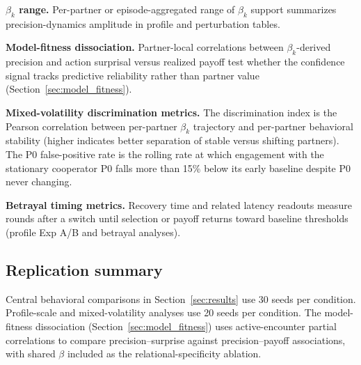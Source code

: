 \textbf{$\beta_k$ range.} Per-partner or episode-aggregated range of $\beta_k$ support summarizes precision-dynamics amplitude in profile and perturbation tables.

\textbf{Model-fitness dissociation.} Partner-local correlations between $\beta_k$-derived precision and action surprisal versus realized payoff test whether the confidence signal tracks predictive reliability rather than partner value (Section~\ref{sec:model_fitness}).

\textbf{Mixed-volatility discrimination metrics.} The discrimination index is the Pearson correlation between per-partner $\beta_k$ trajectory and per-partner behavioral stability (higher indicates better separation of stable versus shifting partners). The P0 false-positive rate is the rolling rate at which engagement with the stationary cooperator P0 falls more than 15\% below its early baseline despite P0 never changing.

\textbf{Betrayal timing metrics.} Recovery time and related latency readouts measure rounds after a switch until selection or payoff returns toward baseline thresholds (profile Exp A/B and betrayal analyses).

\subsection{Replication summary}

Central behavioral comparisons in Section~\ref{sec:results} use 30 seeds per condition. Profile-scale and mixed-volatility analyses use 20 seeds per condition. The model-fitness dissociation (Section~\ref{sec:model_fitness}) uses active-encounter partial correlations to compare precision--surprise against precision--payoff associations, with shared $\beta$ included as the relational-specificity ablation.
